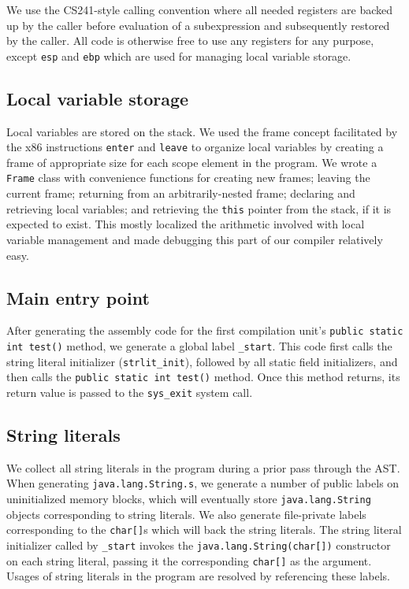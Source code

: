 \documentclass[12pt]{article}
\newcommand{\code}[1]{\texttt{#1}}
\begin{document}
We use the CS241-style calling convention where all needed registers are backed up by the caller before evaluation of a subexpression and subsequently restored by the caller.  All code is otherwise free to use any registers for any purpose, except \code{esp} and \code{ebp} which are used for managing local variable storage.

\subsection{Local variable storage}

Local variables are stored on the stack.  We used the frame concept facilitated by the x86 instructions \code{enter} and \code{leave} to organize local variables by creating a frame of appropriate size for each scope element in the program.  We wrote a \code{Frame} class with convenience functions for creating new frames; leaving the current frame; returning from an arbitrarily-nested frame; declaring and retrieving local variables; and retrieving the \code{this} pointer from the stack, if it is expected to exist.  This mostly localized the arithmetic involved with local variable management and made debugging this part of our compiler relatively easy.

\subsection{Main entry point}

After generating the assembly code for the first compilation unit's \code{public static int test()} method, we generate a global label \code{\_start}. This code first calls the string literal initializer (\code{strlit\_init}), followed by all static field initializers, and then calls the \code{public static int test()} method. Once this method returns, its return value is passed to the \code{sys\_exit} system call.

\subsection{String literals}

We collect all string literals in the program during a prior pass through the AST.  When generating \code{java.lang.String.s}, we generate a number of public labels on uninitialized memory blocks, which will eventually store \code{java.lang.String} objects corresponding to string literals.  We also generate file-private labels corresponding to the \code{char[]}s which will back the string literals.  The string literal initializer called by \code{\_start} invokes the \code{java.lang.String(char[])} constructor on each string literal, passing it the corresponding \code{char[]} as the argument.  Usages of string literals in the program are resolved by referencing these labels.
\end{document}
